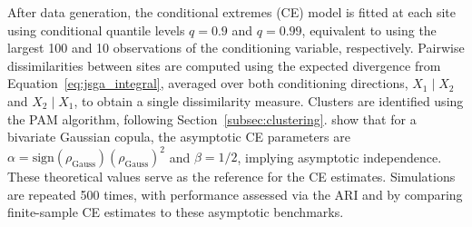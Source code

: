 \documentclass[
  12pt]{article}
\newcommand{\JSGa}{\mathop{\mathrm{JS}^{\mathrm{G}_{\lambda}}}\nolimits}
\begin{document}
After data generation, the conditional extremes (CE) model is fitted at each site using conditional quantile levels \(q=0.9\) and \(q=0.99\), equivalent to using the largest 100 and 10 observations of the conditioning variable, respectively.
Pairwise dissimilarities between sites are computed using the expected divergence from Equation~\eqref{eq:jsga_integral}, averaged over both conditioning directions, \(X_1 \mid X_2\) and \(X_2 \mid X_1\), to obtain a single dissimilarity measure.
Clusters are identified using the PAM algorithm, following Section~\ref{subsec:clustering}. 
\citet{Keef2013} show that for a bivariate Gaussian copula, the asymptotic CE parameters are $\alpha = \text{sign}(\rho_{\text{Gauss}}) (\rho_{\text{Gauss}})^2$ and $\beta = 1/2$, implying asymptotic independence.  
These theoretical values serve as the reference for the CE estimates.
Simulations are repeated 500 times, with performance assessed via the ARI and by comparing finite-sample CE estimates to these asymptotic benchmarks. 
\end{document}
